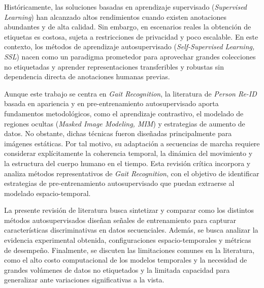 Históricamente, las soluciones basadas en aprendizaje supervisado (\textit{Supervised Learning}) han alcanzado altos rendimientos cuando existen anotaciones abundantes y de alta calidad. Sin embargo, en escenarios reales la obtención de etiquetas es costosa, sujeta a restricciones de privacidad y poco escalable. En este contexto, los métodos de aprendizaje autosupervisado (\textit{Self-Supervised Learning, SSL}) nacen como un paradigma prometedor para aprovechar grandes colecciones no etiquetadas y aprender representaciones transferibles y robustas sin dependencia directa de anotaciones humanas previas.

Aunque este trabajo se centra en \textit{Gait Recognition}, la literatura de \textit{Person Re-ID} basada en apariencia y en pre-entrenamiento autosupervisado aporta fundamentos metodológicos, como el aprendizaje contrastivo, el modelado de regiones ocultas (\textit{Masked Image Modeling, MIM}) y estrategias de aumento de datos. No obstante, dichas técnicas fueron diseñadas principalmente para imágenes estáticas. Por tal motivo, su adaptación a secuencias de marcha requiere considerar explícitamente la coherencia temporal, la dinámica del movimiento y la estructura del cuerpo humano en el tiempo. Esta revisión crítica incorpora y analiza métodos representativos de \textit{Gait Recognition}, con el objetivo de identificar estrategias de pre-entrenamiento autosupervisado que puedan extraerse al modelado espacio-temporal.

La presente revisión de literatura busca sintetizar y comparar como los distintos métodos autosupervisados diseñan señales de entrenamiento para capturar características discriminativas en datos secuenciales. Además, se busca analizar la evidencia experimental obtenida, configuraciones espacio-temporales y métricas de desempeño. Finalmente, se discuten las limitaciones comunes en la literatura, como el alto costo computacional de los modelos temporales y la necesidad de grandes volúmenes de datos no etiquetados y la limitada capacidad para generalizar ante variaciones significativas a la vista.

